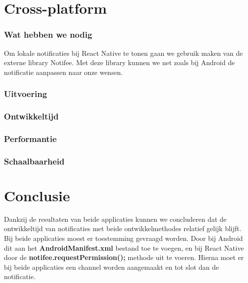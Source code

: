 

\clearpage
\section{Cross-platform}
\subsubsection{Wat hebben we nodig}
Om lokale notificaties bij React Native te tonen gaan we gebruik maken van de externe library Notifee.
Met deze library kunnen we net zoals bij Android de notificatie aanpassen naar onze wensen.

\subsubsection{Uitvoering}



\subsubsection{Ontwikkeltijd}



\subsubsection{Performantie}



\subsubsection{Schaalbaarheid}



\section{Conclusie}
Dankzij de resultaten van beide applicaties kunnen we concluderen dat de ontwikkeltijd van notificaties met 
beide ontwikkelmethodes relatief gelijk blijft. Bij beide applicaties moest er toestemming gevraagd worden. 
Door bij Android dit aan het \textbf{AndroidManifest.xml} bestand toe te voegen, en bij React Native door 
de \textbf{notifee.requestPermission();} methode uit te voeren. Hierna moet er bij beide applicaties een 
channel worden aangemaakt en tot slot dan de notificatie.

